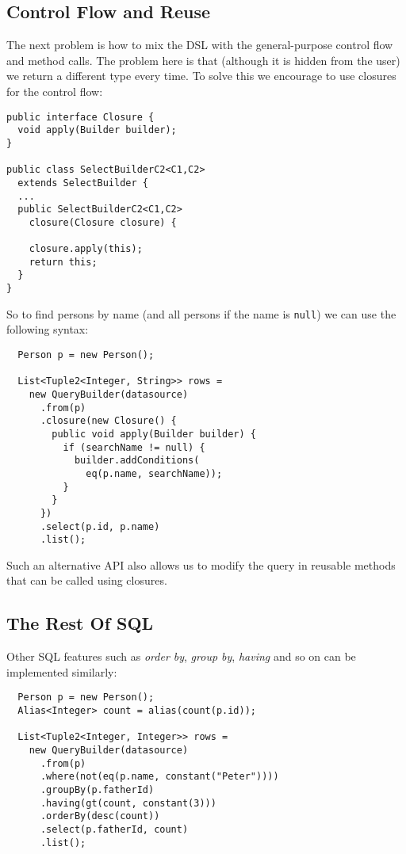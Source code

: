 \documentclass{sig-alternate}
\begin{document}
\subsection{Control Flow and Reuse}

The next problem is how to mix the DSL with the general-purpose control flow and method calls. The problem here is that (although it is hidden from the user) we return a different type every time. To solve this we encourage to use closures for the control flow:

\begin{verbatim}
public interface Closure {
  void apply(Builder builder);
}

public class SelectBuilderC2<C1,C2> 
  extends SelectBuilder {
  ...
  public SelectBuilderC2<C1,C2> 
    closure(Closure closure) {

    closure.apply(this);
    return this;
  }
}
\end{verbatim}

So to find persons by name (and all persons if the name is \verb!null!) we can use the following syntax:

\begin{verbatim}
  Person p = new Person();

  List<Tuple2<Integer, String>> rows =
    new QueryBuilder(datasource)
      .from(p)
      .closure(new Closure() {
        public void apply(Builder builder) {
          if (searchName != null) {
            builder.addConditions(
              eq(p.name, searchName));
          }
        }
      })
      .select(p.id, p.name)
      .list();
\end{verbatim}

Such an alternative API also allows us to modify the query in reusable methods that can be called using closures.

\subsection{The Rest Of SQL}

Other SQL features such as \emph{order by}, \emph{group by}, \emph{having} and so on can be implemented similarly:

\begin{verbatim}
  Person p = new Person();
  Alias<Integer> count = alias(count(p.id));

  List<Tuple2<Integer, Integer>> rows =
    new QueryBuilder(datasource)
      .from(p)
      .where(not(eq(p.name, constant("Peter"))))
      .groupBy(p.fatherId)
      .having(gt(count, constant(3)))
      .orderBy(desc(count))
      .select(p.fatherId, count)
      .list();
\end{verbatim}
\end{document}
